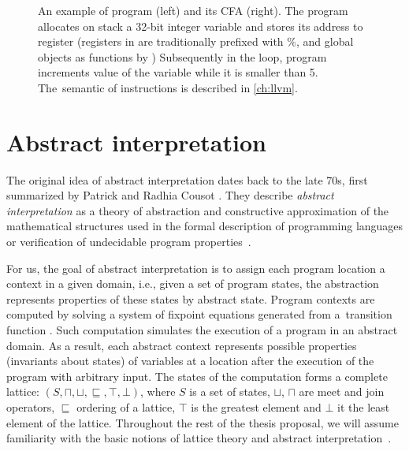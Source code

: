 \begin{figure}
\begin{minipage}[t]{0.48\textwidth}
\begin{tikzpicture}[node distance=1.1em]
\end{tikzpicture}
\end{minipage}

\caption{An example of \llvm program (left) and its CFA (right).  The program
allocates on stack a 32-bit integer variable and stores its address to register
 (registers in \llvm are traditionally prefixed with \%,
and global objects as functions by \@) Subsequently in the loop, program
increments value of the variable while it is smaller than 5. The~semantic of
instructions is described in \autoref{ch:llvm}.}
\label{fig:cfa}
\end{figure}

\section{Abstract interpretation}
\label{sec:abstraction}

The original idea of abstract interpretation dates back to the late 70s, first
summarized by Patrick and Radhia Cousot \cite{Cousot1977}.
They describe \emph{abstract interpretation} as a theory of abstraction and
constructive approximation of the mathematical structures used in the formal
description of programming languages or verification of undecidable program
properties~\cite{Cousot2012}.

For us, the goal of abstract interpretation is to assign each program location
a context in a given domain, i.e., given a set of program states, the
abstraction represents properties of these states by abstract state. Program
contexts are computed by solving a system of fixpoint equations generated from
a~transition function \cite{Cousot1977}. Such computation simulates the
execution of a program in an abstract domain. As a result, each abstract
context represents possible properties (invariants about states) of variables
at a location after the execution of the program \label{sec:symbolic}
with arbitrary input. The states of the computation forms
a complete lattice: $(S, \sqcap, \sqcup, \sqsubseteq, \top, \bot)$, where $S$
is a set of states, $\sqcup$, $\sqcap$ are meet and join operators,
$\sqsubseteq$ ordering of a lattice, $\top$ is the greatest element and $\bot$
it the least element of the lattice. Throughout the rest of the thesis proposal,
we will assume familiarity with the basic notions of lattice theory
\cite{Birkhoff1940} and abstract interpretation~\cite{Cousot1977}.

